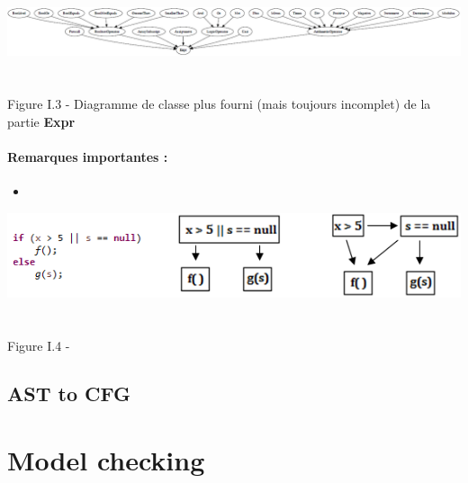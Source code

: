 \documentclass{report}
\begin{document}
\begin{center}
\includegraphics[scale=0.5]{data/expr2.png}
~\\~\\Figure I.3 - Diagramme de classe plus fourni (mais toujours incomplet) de la partie \textbf{Expr}
\end{center}

\subsubsection{Remarques importantes :}

\vspace{4mm}
\begin{itemize}
\item \vspace{1mm}
\end{itemize}

\begin{center}
\includegraphics[scale=0.85]{data/fail-fast.png}
~\\~\\Figure I.4 - 
\end{center}

\paragraph{}
\hspace{4mm}\textnormal{}

\section{AST to CFG}

\paragraph{}
\hspace{4mm}\textnormal{}

\chapter{Model checking}
\end{document}
